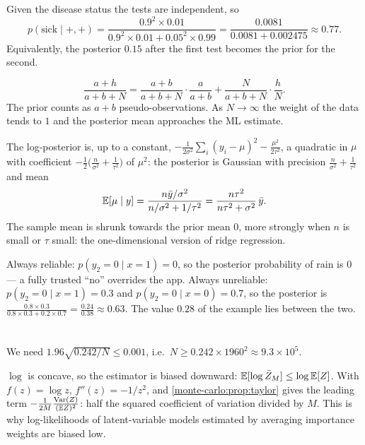 Given the disease status the tests are independent, so
\[
  p(\text{sick}\mid+,+) = \frac{0.9^2\times0.01}{0.9^2\times0.01 + 0.05^2\times0.99}
  = \frac{0.0081}{0.0081 + 0.002475}\approx0.77 .
\]
Equivalently, the posterior $0.15$ after the first test becomes the prior for the
second.

\[
  \frac{a+h}{a+b+N} = \frac{a+b}{a+b+N}\cdot\frac{a}{a+b} + \frac{N}{a+b+N}\cdot\frac hN .
\]
The prior counts as $a+b$ pseudo-observations. As $N\to\infty$ the weight of the
data tends to $1$ and the posterior mean approaches the ML estimate.

The log-posterior is, up to a constant,
$-\frac1{2\sigma^2}\sum_i(y_i - \mu)^2 - \frac{\mu^2}{2\tau^2}$, a quadratic in $\mu$ with
coefficient $-\frac12\bigl(\frac n{\sigma^2} + \frac1{\tau^2}\bigr)$ of $\mu^2$: the
posterior is Gaussian with precision $\frac n{\sigma^2} + \frac1{\tau^2}$ and mean
\[
  \mathbb{E}[\mu\mid y] = \frac{n\bar y/\sigma^2}{n/\sigma^2 + 1/\tau^2} = \frac{n\tau^2}{n\tau^2 + \sigma^2}\,\bar y .
\]
The sample mean is shrunk towards the prior mean $0$, more strongly when $n$ is small
or $\tau$ small: the one-dimensional version of ridge regression.

Always reliable: $p(y_2 = 0\mid x = 1) = 0$, so the posterior probability of rain is
$0$ --- a fully trusted ``no'' overrides the app. Always unreliable:
$p(y_2 = 0\mid x = 1) = 0.3$ and $p(y_2 = 0\mid x = 0) = 0.7$, so the posterior is
$\frac{0.8\times0.3}{0.8\times0.3 + 0.2\times0.7} = \frac{0.24}{0.38}\approx0.63$.
The value $0.28$ of the example lies between the two.

\section{}

We need $1.96\sqrt{0.242/N}\leq0.001$, i.e.\ $N\geq0.242\times1960^2\approx9.3\times10^5$.

$\log$ is concave, so the estimator is biased downward:
$\mathbb{E}[\log\bar Z_M]\leq\log\mathbb{E}[Z]$. With $f(z) = \log z$, $f''(z) = -1/z^2$, and
\cref{monte-carlo:prop:taylor} gives the leading term
$-\frac{1}{2M}\frac{\operatorname{Var}(Z)}{(\mathbb{E} Z)^2}$: half the squared coefficient of variation divided
by $M$. This is why log-likelihoods of latent-variable models estimated by
averaging importance weights are biased low.

